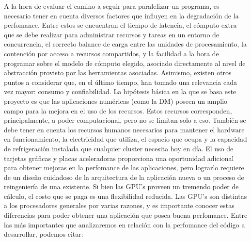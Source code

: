 \documentclass[a4paper,10pt]{article}
\begin{document}
A la hora de evaluar el camino a seguir para paralelizar un programa, es necesario tener en cuenta diversos factores que influyen en la degradaci\'on de la perfomance. Entre estos se encuentran el tiempo de latencia, el c\'omputo extra que se debe realizar para administrar recursos y tareas en un entorno de concurrencia, el correcto balance de carga entre las unidades de procesamiento, la contenci\'on por acceso a recursos compartidos, y la facilidad a la hora de programar sobre el modelo de c\'omputo elegido, asociado directamente al nivel de abstracci\'on provisto por las herramientas asociadas.  Asimismo, existen otros puntos a considerar que, en el \'ultimo tiempo, han tomado una relevancia cada vez mayor: consumo y confiabilidad.
La hip\'otesis b\'asica en la que se basa este proyecto es que las aplicaciones num\'ericas (como la DM) poseen un amplio campo para la mejora en el uso de los recursos.
Estos recursos corresponden, principalmente, a poder computacional, pero no se limitan solo a eso. Tambi\'en se debe tener en cuenta los recursos humanos necesarios para mantener el hardware en funcionamiento, la electricidad que utiliza, el espacio que ocupa y la capacidad de refrigeraci\'on instalada que cualquier cluster necesita hoy en d\'ia.
El uso de tarjetas gr\'aficas y placas aceleradoras proporciona una oportunidad adicional para obtener mejoras en la perfomance de las aplicaciones, pero lograrlo requiere de un dise\~no cuidadoso de la arquitectura de la aplicaci\'on nueva o un proceso de reingenier\'ia de una existente.
Si bien las GPU's proveen un tremendo poder de c\'alculo, el costo que se paga es una flexibilidad reducida. 
Las GPU's son distintas a los procesadores generales por varias razones, y es importante conocer estas diferencias para poder obtener una aplicaci\'on que posea buena perfomance. 
Entre las m\'as importantes que analizaremos en relaci\'on con la perfomance del c\'odigo a desarrollar, podemos citar:
\end{document}

